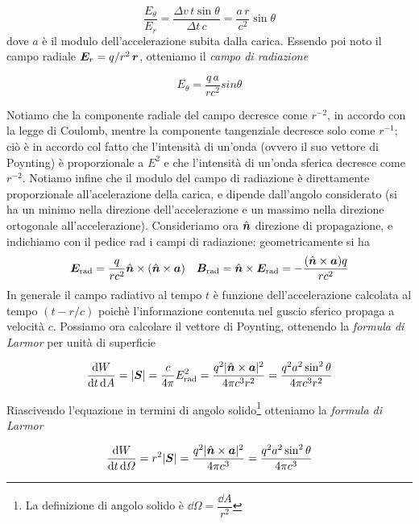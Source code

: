 \begin{equation}
\dfrac{{E}_\theta}{{E}_r} = \dfrac{\Delta v \, t \sin \theta}{\Delta t \,c} = \dfrac{a\,r}{c^2} \sin\theta
\end{equation}
dove $a$ è il modulo dell'accelerazione subita dalla carica. Essendo poi noto il campo radiale $\V{E}_r = q/r^2 \,\V{r}$, otteniamo il \textit{campo di radiazione}
\begin{EQ}
\begin{equation}
E_\theta = \dfrac{q \,a}{rc^2} sin\theta
\end{equation}
\end{EQ}
Notiamo che la componente radiale del campo decresce come $r^{-2}$, in accordo con la legge di Coulomb, mentre la componente tangenziale decresce solo come $r^{-1}$; ciò è in accordo col fatto che l'intensità di un'onda (ovvero il suo vettore di Poynting) è proporzionale a $E^2$ e che l'intensità di un'onda sferica decresce come $r^{-2}$. Notiamo infine che il modulo del campo di radiazione è direttamente proporzionale all'acelerazione della carica, e dipende dall'angolo considerato (si ha un minimo nella direzione dell'accelerazione e un massimo nella direzione ortogonale all'accelerazione).
Consideriamo ora $\vers{n}$ direzione di propagazione, e indichiamo con il pedice rad i campi di radiazione: geometricamente si ha
\begin{align}
&\V{E}_\mathrm{rad} = \dfrac{q}{rc^2} \vers{n}\times(\vett{\hat{n}}{a})
&\V{B}_\mathrm{rad} = \vers{n}\times \V{E}_\mathrm{rad} = - \dfrac{(\vett{\hat{n}}{a})q}{rc^2}
\end{align}
In generale il campo radiativo al tempo $t$ è funzione dell'accelerazione calcolata al tempo $(t-r/c)$ poichè l'informazione contenuta nel guscio sferico propaga a velocità $c$. Possiamo ora calcolare il vettore di Poynting, ottenendo la \textit{formula di Larmor} per unità di superficie
\begin{EQ}
\begin{equation}
\dfrac{\dd W}{\dd t \, \dd A} = |\V{S}| = \dfrac{c}{4\pi} E_\mathrm{rad}^2 = \dfrac{q^2 |\vett{\hat{n}}{a}|^2}{4\pi c^3 r^2} = \dfrac{q^2 a^2 \sin^2 \theta}{4\pi c^3 r^2} \label{eq:Larmor1}
\end{equation}
\end{EQ}
Riascivendo l'equazione in termini di angolo solido\footnote{La definizione di angolo solido è $\dd \Omega = \dfrac{\dd A}{r^2}$} otteniamo la \textit{formula di Larmor}
\begin{EQ}
\begin{equation}
\dfrac{\dd W}{\dd t \, \dd \Omega} = r^2|\V{S}| =\dfrac{q^2 |\vett{\hat{n}}{a}|^2}{4\pi c^3} = \dfrac{q^2 a^2 \sin^2 \theta}{4\pi c^3} \label{eq:Larmor2}
\end{equation}
\end{EQ}
